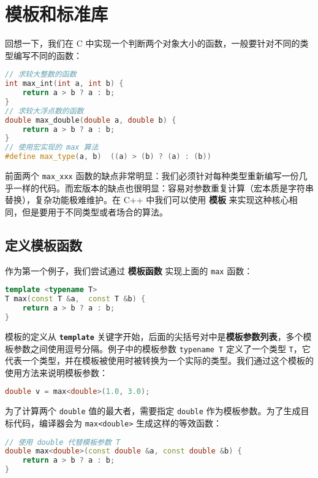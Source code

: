 \section{模板和标准库}

回想一下，我们在 C 中实现一个判断两个对象大小的函数，一般要针对不同的类型编写不同的函数：
\begin{lstlisting}[language=c++]
// 求较大整数的函数
int max_int(int a, int b) {
    return a > b ? a : b;
}
// 求较大浮点数的函数
double max_double(double a, double b) {
    return a > b ? a : b;
}
// 使用宏实现的 max 算法
#define max_type(a, b)  ((a) > (b) ? (a) : (b))
\end{lstlisting}
前面两个 \texttt{max\_xxx} 函数的缺点非常明显：我们必须针对每种类型重新编写一份几乎一样的代码。而宏版本的缺点也很明显：容易对参数重复计算（宏本质是字符串替换），复杂功能极难维护。在 C++ 中我们可以使用 \textbf{模板} 来实现这种核心相同，但是要用于不同类型或者场合的算法。

\subsection{定义模板函数}

作为第一个例子，我们尝试通过 \textbf{模板函数} 实现上面的 \texttt{max} 函数：
\begin{lstlisting}[language=c++]
template <typename T>
T max(const T &a,  const T &b) {
    return a > b ? a : b;
}
\end{lstlisting}
模板的定义从 \textbf{\texttt{template}} 关键字开始，后面的尖括号对中是\textbf{模板参数列表}，多个模板参数之间使用逗号分隔。例子中的模板参数 \texttt{typename T} 定义了一个类型 \texttt{T}，它代表一个类型，并在模板被使用时被转换为一个实际的类型。我们通过这个模板的使用方法来说明模板参数：
\begin{lstlisting}[language=c++,numbers=none]
double v = max<double>(1.0, 3.0);
\end{lstlisting}
为了计算两个 \texttt{double} 值的最大者，需要指定 \texttt{double} 作为模板参数。为了生成目标代码，编译器会为 \texttt{max<double>} 生成这样的等效函数：
\begin{lstlisting}[language=c++]
// 使用 double 代替模板参数 T
double max<double>(const double &a, const double &b) {
    return a > b ? a : b;
}
\end{lstlisting}


